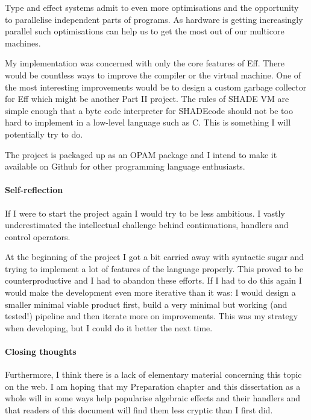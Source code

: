 \documentclass[class=article, crop=false]{standalone}
\begin{document}

Type and effect systems admit to even more optimisations and the opportunity to
parallelise independent parts of programs. As hardware is getting increasingly
parallel such optimisations can help us to get the most out of our multicore
machines.


My implementation was concerned with only the core features of Eff. There would
be countless ways to improve the compiler or the virtual machine. One of the
most interesting improvements would be to design a custom garbage collector for
Eff which might be another Part II project. The rules of SHADE VM are simple
enough that a byte code interpreter for SHADEcode should not be too hard to
implement in a low-level language such as C. This is something I will
potentially try to do.

The project is packaged up as an OPAM package and I intend to make it available
on Github for other programming language enthusiasts.

\paragraph{Self-reflection}

If I were to start the project again I would try to be less ambitious. I vastly
underestimated the intellectual challenge behind continuations, handlers and
control operators.

At the beginning of the project I got a bit carried away with syntactic sugar
and trying to implement a lot of features of the language properly. This proved
to be counterproductive and I had to abandon these efforts. If I had to do this
again I would make the development even more iterative than it was: I would
design a smaller minimal viable product first, build a very minimal but working
(and tested!) pipeline and then iterate more on improvements. This was my
strategy when developing, but I could do it better the next time.

\paragraph{Closing thoughts}

Furthermore, I think there is a lack of elementary material concerning this
topic on the web. I am hoping that my Preparation chapter and this dissertation
as a whole will in some ways help popularise algebraic effects and their
handlers and that readers of this document will find them less cryptic than I
first did.
\end{document}

